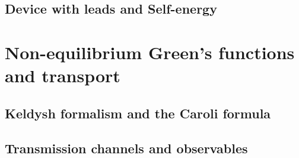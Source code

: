 \subsection{Device with leads and Self-energy}
\label{sec:selfenergy}

\section{Non-equilibrium Green's functions and transport}
\label{sec:negf}

\subsection{Keldysh formalism and the Caroli formula}
\label{sec:keldysh}

\subsection{Transmission channels and observables}
\label{sec:channels}

